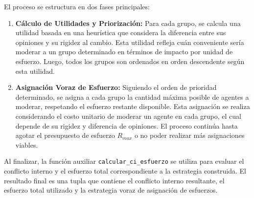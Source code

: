 \documentclass[11pt,letter]{article}
\begin{document}
    El proceso se estructura en dos fases principales:

    \begin{enumerate}
        \item \textbf{Cálculo de Utilidades y Priorización:} Para cada grupo, se calcula una utilidad basada en una heurística que considera la diferencia entre sus opiniones y su rigidez al cambio. Esta utilidad refleja cuán conveniente sería moderar a un grupo determinado en términos de impacto por unidad de esfuerzo. Luego, todos los grupos son ordenados en orden descendente según esta utilidad.

        \item \textbf{Asignación Voraz de Esfuerzo:} Siguiendo el orden de prioridad determinado, se asigna a cada grupo la cantidad máxima posible de agentes a moderar, respetando el esfuerzo restante disponible. Esta asignación se realiza considerando el costo unitario de moderar un agente en cada grupo, el cual depende de su rigidez y diferencia de opiniones. El proceso continúa hasta agotar el presupuesto de esfuerzo $R_{max}$ o no poder realizar más asignaciones viables.
    \end{enumerate}

    Al finalizar, la función auxiliar \texttt{calcular\_ci\_esfuerzo} se utiliza para evaluar el conflicto interno y el esfuerzo total correspondiente a la estrategia construida. El resultado final es una tupla que contiene el conflicto interno resultante, el esfuerzo total utilizado y la estrategia voraz de asignación de esfuerzos.
\end{document}
